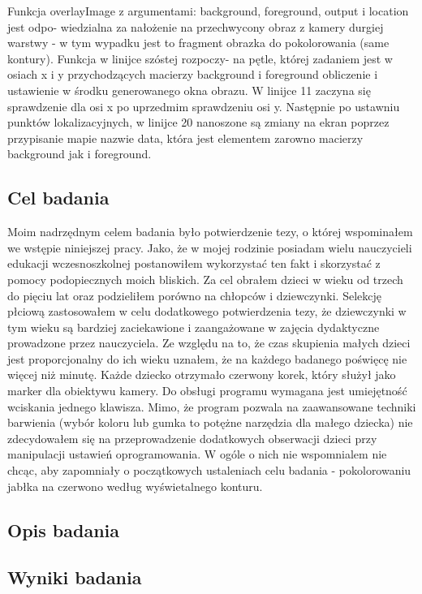 \documentclass{article}
\begin{document}
	Funkcja overlayImage z argumentami: background, foreground, output i location jest odpo- wiedzialna za nałożenie na przechwycony obraz z kamery durgiej warstwy - w tym wypadku jest to fragment obrazka do pokolorowania (same kontury).
	Funkcja w linijce szóstej rozpoczy- na pętle, której zadaniem jest w osiach x i y przychodzących macierzy background i foreground obliczenie i ustawienie w środku generowanego okna obrazu. W linijce 11 zaczyna się sprawdzenie dla osi x po uprzedmim sprawdzeniu osi y. Następnie po ustawniu punktów lokalizacyjnych, w linijce 20 nanoszone są zmiany na ekran poprzez przypisanie mapie nazwie data, która jest elementem zarowno macierzy background jak i foreground.
	
	\subsection{Cel badania}
	\par
	Moim nadrzędnym celem badania było potwierdzenie tezy, o której wspominałem we wstępie niniejszej pracy. Jako, że w mojej rodzinie posiadam wielu nauczycieli edukacji wczesnoszkolnej postanowiłem wykorzystać ten fakt i skorzystać z pomocy podopiecznych moich bliskich. Za cel obrałem dzieci w wieku od trzech do pięciu lat oraz podzieliłem porówno na chłopców i dziewczynki. Selekcję płciową zastosowałem w celu dodatkowego potwierdzenia tezy, że dziewczynki w tym wieku są bardziej zaciekawione i zaangażowane w zajęcia dydaktyczne prowadzone przez nauczyciela. Ze względu na to, że czas skupienia małych dzieci jest proporcjonalny do ich wieku uznałem, że na każdego badanego poświęcę nie więcej niż minutę. Każde dziecko otrzymało czerwony korek, który służył jako marker dla obiektywu kamery. Do obsługi programu wymagana jest umiejętność wciskania jednego klawisza. Mimo, że program pozwala na zaawansowane techniki barwienia (wybór koloru lub gumka to potężne narzędzia dla małego dziecka) nie zdecydowałem się na przeprowadzenie dodatkowych obserwacji dzieci przy manipulacji ustawień oprogramowania. W ogóle o nich nie wspomnialem nie chcąc, aby zapomniały o początkowych ustaleniach celu badania - pokolorowaniu jabłka na czerwono według wyświetalnego konturu.
	
	\subsection{Opis badania}
	
	\subsection{Wyniki badania}
	
\end{document}
